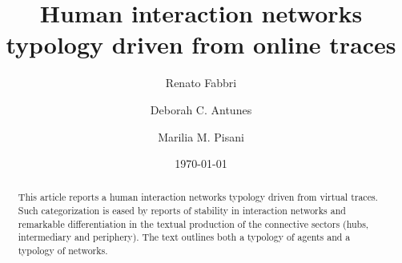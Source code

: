 \documentclass[%
 aip,
 jmp,%
 amsmath,amssymb,
 reprint,%
]{revtex4-1}
\begin{document}

\title[Human interaction typology]{Human interaction networks typology driven from online traces}%

\author{Renato Fabbri}%

\author{Deborah C. Antunes}

\author{Marilia M. Pisani}

%



\date{\today}%

\begin{abstract}
	This article reports a human interaction networks typology driven from virtual traces. Such categorization is eased by reports of stability in interaction networks and remarkable differentiation in the textual production of the connective sectors (hubs, intermediary and periphery). The text outlines both a typology of agents and a typology of networks.
\end{abstract}
\end{document}
